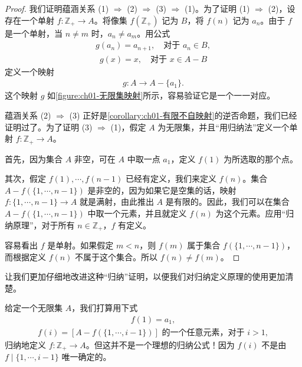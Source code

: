 \documentclass[../../main.tex]{subfiles}
\begin{document}
\begin{proof}
我们证明蕴涵关系 (1) $\Longrightarrow$ (2) $\Longrightarrow$ (3) $\Longrightarrow$ (1)。为了证明 (1) $\Longrightarrow$ (2)，设存在一个单射 $f: \mathbb{Z}_{+} \longrightarrow A$。将像集 $f(\mathbb{Z}_{+})$ 记为 $B$，将 $f(n)$ 记为 $a_{n}$。由于 $f$ 是一个单射，当 $n \neq m$ 时，$a_{n} \neq a_{m}$。用公式
\begin{align*}
g(a_{n}) = a_{n+1}, \quad \text{对于 } a_{n} \in B,
\end{align*}
\begin{align*}
g(x) = x, \quad \text{对于 } x \in A - B
\end{align*}
定义一个映射
\begin{align*}
g: A \longrightarrow A - \{a_{1}\}.
\end{align*}
这个映射 $g$ 如\cref{figure:ch01-无限集映射}所示，容易验证它是一个一一对应。


蕴涵关系 (2) $\Longrightarrow$ (3) 正好是\cref{corollary:ch01-有限不自映射}的逆否命题，我们已经证明过了。为了证明 (3) $\Longrightarrow$ (1)，假定 $A$ 为无限集，并且“用归纳法”定义一个单射 $f: \mathbb{Z}_{+} \longrightarrow A$。

首先，因为集合 $A$ 非空，可在 $A$ 中取一点 $a_{1}$，定义 $f(1)$ 为所选取的那个点。

其次，假定 $f(1), \cdots, f(n-1)$ 已经有定义，我们来定义 $f(n)$。集合 $A - f(\{1, \cdots, n-1\})$ 是非空的，因为如果它是空集的话，映射 $f: \{1, \cdots, n-1\} \longrightarrow A$ 就是满射，由此推出 $A$ 是有限的。因此，我们可以在集合 $A - f(\{1, \cdots, n-1\})$ 中取一个元素，并且就定义 $f(n)$ 为这个元素。应用“归纳原理”，对于所有 $n \in \mathbb{Z}_{+}$，$f$ 有定义。

容易看出 $f$ 是单射。如果假定 $m < n$，则 $f(m)$ 属于集合 $f(\{1, \cdots, n-1\})$，而根据定义 $f(n)$ 不属于这个集合。所以 $f(n) \neq f(m)$。
\end{proof}

让我们更加仔细地改进这种“归纳”证明，以便我们对归纳定义原理的使用更加清楚。

给定一个无限集 $A$，我们打算用下式
\begin{align}
f(1) = a_{1},\label{align:ch01-选择归纳}
\end{align}
\begin{align*}
f(i) = [A - f(\{1, \cdots, i-1\})] \text{ 的一个任意元素，对于 } i > 1,
\end{align*}
归纳地定义 $f: \mathbb{Z}_{+} \longrightarrow A$。但这并不是一个理想的归纳公式！因为 $f(i)$ 不是由 $f \mid \{1, \cdots, i-1\}$ 唯一确定的。
\end{document}
